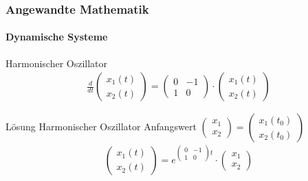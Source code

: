 \documentclass{beamer}
\begin{document}
\begin{frame}
    \frametitle{Angewandte Mathematik}
\framesubtitle{Dynamische Systeme }
\begin{block}{Harmonischer Oszillator}
\begin{align*}
    \frac{d}{dt}\begin{pmatrix}
        x_1(t) \\ x_2(t)
    \end{pmatrix} = 
\begin{pmatrix}
    0 & -1  \\ 1 & 0
\end{pmatrix} \cdot
\begin{pmatrix} 
    x_1(t) \\ x_2(t)
\end{pmatrix} 
\end{align*}
\end{block}

\begin{block}{Lösung Harmonischer Oszillator}
    Anfangswert $\begin{pmatrix}
        x_1 \\ x_2\end{pmatrix} = \begin{pmatrix}
            x_1(t_0) \\ x_2(t_0)\end{pmatrix}$
    \begin{align*}
        \begin{pmatrix}
            x_1(t) \\ x_2(t)
        \end{pmatrix} = e^{ \begin{pmatrix}
            0 & -1  \\ 1 & 0
        \end{pmatrix} t } \cdot \begin{pmatrix}
            x_1\\ x_2
        \end{pmatrix}
    \end{align*}
\end{block}

 \end{frame}
\end{document}
